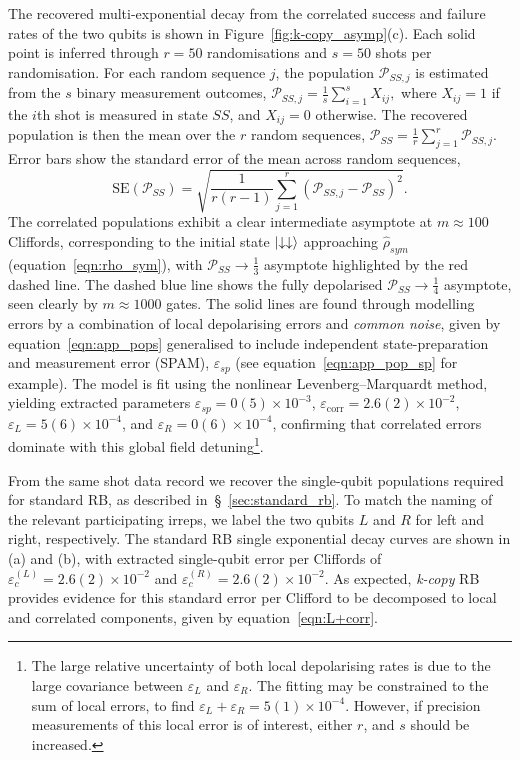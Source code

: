 The recovered multi-exponential decay from the correlated success and failure rates of the two qubits is shown in Figure~\ref{fig:k-copy_asymp}(c). Each solid point is inferred through $r=50$ randomisations and $s=50$ shots per randomisation.
%
For each random sequence $j$, the population $\mathcal{P}_{SS,j}$ is estimated from the $s$ binary measurement outcomes,
$\mathcal{P}_{SS,j} = \frac{1}{s}\sum_{i=1}^{s} X_{ij},$
where $X_{ij}=1$ if the $i$th shot is measured in state $SS$, and $X_{ij}=0$ otherwise. The recovered population is then the mean over the $r$ random sequences,
$
\mathcal{P}_{SS} = \frac{1}{r}\sum_{j=1}^{r} \mathcal{P}_{SS,j}.
$
Error bars show the standard error of the mean across random sequences,
\begin{equation}
\mathrm{SE}(\mathcal{P}_{SS})
=
\sqrt{
\frac{1}{r(r-1)}
\sum_{j=1}^{r}
\left(\mathcal{P}_{SS,j}-\mathcal{P}_{SS}\right)^2
}.
\end{equation}
%
The correlated populations exhibit a clear intermediate asymptote at
$m \approx 100$ Cliffords, corresponding to the initial state $\ket{\downarrow\downarrow}$
approaching $\hat\rho_{sym}$ (equation~\ref{eqn:rho_sym}), with $\mathcal{P}_{SS}\rightarrow \frac{1}{3}$ asymptote highlighted by the red dashed line. The dashed blue line shows the fully depolarised $\mathcal{P}_{SS}\rightarrow\frac{1}{4}$ asymptote, seen clearly by $m \approx 1000$ gates. 
The solid lines are found through modelling errors by a combination of local depolarising errors and \emph{common noise}, given by equation~\ref{eqn:app_pops} generalised to include independent state-preparation and measurement error (SPAM), $\varepsilon_{sp}$ (see equation~\ref{eqn:app_pop_sp} for example). 
The model is fit using the nonlinear Levenberg–Marquardt method, yielding
extracted parameters
$\varepsilon_{sp}=0(5)\times10^{-3}$, $\varepsilon_\mathrm{corr}=2.6(2)\times10^{-2}$, $\varepsilon_L=5(6)\times10^{-4}$, and
$\varepsilon_R=0(6)\times10^{-4}$, confirming that correlated errors dominate with this global field detuning\footnote{The large relative uncertainty of both local depolarising rates is due to the large covariance between $\varepsilon_L$ and $\varepsilon_R$. The fitting may be constrained to the sum of local errors, to find $\varepsilon_L + \varepsilon_R = 5(1)\times10^{-4}$. However, 
if precision measurements of this local error is of interest, either $r$, and $s$ should be increased.}.

From the same shot data record we recover the single-qubit populations required for standard RB, as described in~\S~\ref{sec:standard_rb}. To match the naming of the relevant participating irreps, we label the two qubits $L$ and $R$ for left and right, respectively. 
The standard RB single exponential decay curves are shown in (a) and (b), with extracted single-qubit error per Cliffords of $\varepsilon_c^{(L)} = 2.6(2)\times10^{-2} $ and $\varepsilon_c^{(R)}=2.6(2)\times10^{-2}$. As expected, \emph{k-copy} RB provides evidence for this standard error per Clifford to be decomposed to local and correlated components, given by equation~\ref{eqn:L+corr}.

